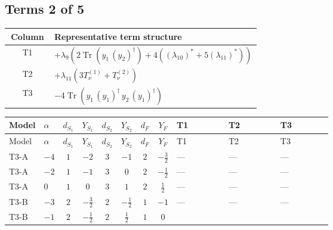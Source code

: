 \documentclass[8pt]{article}
\begin{document}
\begin{landscape}
\subsection*{Terms 2 of 5}
\begin{center}
\begin{tabular}{@{}c >{\raggedright\arraybackslash}p{0.82\linewidth}@{}}
\toprule
Column & Representative term structure \\
\midrule
T1 & \(\displaystyle +{\lambda_{9}} (2 \operatorname{Tr}\!\left({y_1}\,\left({y_2}\right)^{\dagger}\right)+4 (\left({\lambda_{10}}\right)^{*}+5 \left({\lambda_{11}}\right)^{*}))\) \\
\midrule
T2 & \(\displaystyle +{\lambda_{11}} (3 T_{\nu}^{(1)}+T_{\nu}^{(2)})\) \\
\midrule
T3 & \(\displaystyle -4 \operatorname{Tr}\!\left({y_1}\,\left({y_1}\right)^{\dagger}\,{y_2}\,\left({y_1}\right)^{\dagger}\right)\) \\
\midrule
\bottomrule
\end{tabular}
\end{center}
\smallskip
\tiny
\begin{longtable}{@{}llcccccc >{\raggedright\arraybackslash}p{0.21\linewidth} >{\raggedright\arraybackslash}p{0.21\linewidth} >{\raggedright\arraybackslash}p{0.21\linewidth}@{}}
\toprule
Model & $\alpha$ & $d_{S_1}$ & $Y_{S_1}$ & $d_{S_2}$ & $Y_{S_2}$ & $d_F$ & $Y_F$ & T1 & T2 & T3 \\
\midrule
\endfirsthead
\toprule
Model & $\alpha$ & $d_{S_1}$ & $Y_{S_1}$ & $d_{S_2}$ & $Y_{S_2}$ & $d_F$ & $Y_F$ & T1 & T2 & T3 \\
\midrule
\endhead
T3-A & $-4$ & $1$ & $-2$ & $3$ & $-1$ & $2$ & $-\frac{3}{2}$ & --- & --- & --- \\
\midrule
T3-A & $-2$ & $1$ & $-1$ & $3$ & $0$ & $2$ & $-\frac{1}{2}$ & --- & --- & --- \\
\midrule
T3-A & $0$ & $1$ & $0$ & $3$ & $1$ & $2$ & $\frac{1}{2}$ & --- & --- & --- \\
\midrule
T3-B & $-3$ & $2$ & $-\frac{3}{2}$ & $2$ & $-\frac{1}{2}$ & $1$ & $-1$ & --- & --- & --- \\
\midrule
T3-B & $-1$ & $2$ & $-\frac{1}{2}$ & $2$ & $\frac{1}{2}$ & $1$ & $0$ & \scriptsize\adjustbox{max width=\linewidth}{$\begin{gathered} +{\lambda_{9}} (2 \operatorname{Tr}\!\left({y_1}\,\left({y_2}\right)^{\dagger}\right)+4 (\left({\lambda_{10}}\right)^{*}+5 \left({\lambda_{11}}\right)^{*}))\end{gathered}$} & \scriptsize\adjustbox{max width=\linewidth}{$\begin{gathered} +{\lambda_{11}} (3 T_{\nu}^{(1)}+T_{\nu}^{(2)})\end{gathered}$} & \scriptsize\adjustbox{max width=\linewidth}{$\begin{gathered} -4 \operatorname{Tr}\!\left({y_1}\,\left({y_1}\right)^{\dagger}\,{y_2}\,\left({y_1}\right)^{\dagger}\right)\end{gathered}$} \\

\end{longtable}
\end{landscape}
\end{document}
